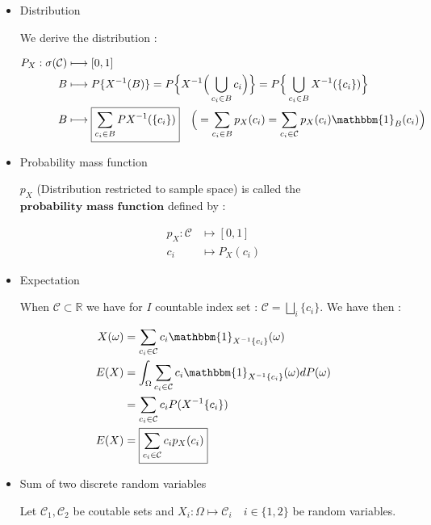 \begin{itemize}
\item Distribution

We derive the distribution : 

\begin{align*}
P_X : \sigma(\mathcal{C}) &\longmapsto [0,1] \\
B &\longmapsto P\{X^{-1}(B)\} = P\Big\{X^{-1}\Big(\bigcup_{c_i \in B} c_i\Big)\Big\} = P\Big\{\bigcup_{c_i \in B}X^{-1}(\{c_i\})\Big\} \\
B &\longmapsto \boxed{\displaystyle\sum_{c_i \in B} PX^{-1}(\{c_i\})} \quad \Big( = \sum_{c_i \in B} p_X(c_i) = \sum_{c_i \in \mathcal{C}} p_X(c_i) \mathbbm{1}_B(c_i)\Big)
\end{align*}

\item Probability mass function

$p_X$ (Distribution restricted to sample space) is called the $\textbf{probability mass function}$ defined by :

\begin{align*}
p_X:\mathcal{C} &\longmapsto [0,1] \\
c_i &\longmapsto P_X(c_i)
\end{align*}


\item Expectation

When $\mathcal{C} \subset \mathbb{R}$ we have for $I$ countable index set : $\mathcal{C} = \bigsqcup_i \{c_i\}$. We have then :

\begin{align*}
    X(\omega) &= \sum_{c_i \in \mathcal{C}} c_i\mathbbm{1}_{X^{-1}\{c_i\}}(\omega) \\
E(X) &= \int_{\Omega} \sum_{c_i \in \mathcal{C}} c_i\mathbbm{1}_{X^{-1}\{c_i\}}(\omega) dP(\omega) \\ 
&= \sum_{c_i \in \mathcal{C}} c_iP(X^{-1}\{c_i\}) \\ 
E(X) &= \boxed{\displaystyle\sum_{c_i \in \mathcal{C}} c_ip_X(c_i)} \\
\end{align*}


\item Sum of two discrete random variables

Let $\mathcal{C}_1, \mathcal{C}_2$ be coutable sets and $X_i:\Omega \longmapsto \mathcal{C}_i \quad i \in \{1,2\}$ be random variables. 



\end{itemize}
